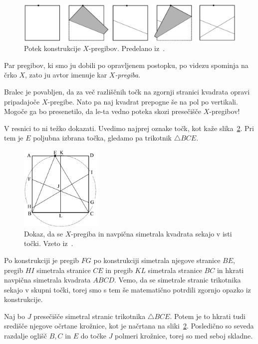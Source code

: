 \begin{figure}[h]
    \centering
    \includegraphics[width=\textwidth]{images/x-pregibi/konstrukcija.png}
    \caption[Konstrukcija $X$-pregibov]{Potek konstrukcije $X$-pregibov. Predelano iz~\cite[str.\ 34]{haga2008}.}
    \label{fig:x-pregib_konstr}
\end{figure}

Par pregibov, ki smo ju dobili po opravljenem postopku, po videzu spominja na črko $X$, zato ju avtor imenuje kar \emph{$X$-pregiba}.

Bralec je povabljen, da za več razliščnih točk na zgornji stranici kvadrata opravi pripadajoče $X$-pregibe. Nato pa naj kvadrat prepogne še na pol po vertikali. Mogoče ga bo presenetilo, da le-ta vedno poteka skozi presečišče $X$-pregibov!

V resnici to ni težko dokazati. Uvedimo najprej oznake točk, kot kaže slika~\ref{fig:x-pregib_dokaz}. Pri tem je $E$ poljubna izbrana točka, gledamo pa trikotnik $\triangle BCE$.
\begin{figure}[h]
    \centering
    \includegraphics[width=0.35\textwidth]{images/x-pregibi/dokaz_presecisca.png}
    \caption[Dokaz presečišča $X$-pregibov]{Dokaz, da se $X$-pregiba in navpična simetrala kvadrata sekajo v isti točki. Vzeto iz~\cite[str.\ 38]{haga2008}.}
    \label{fig:x-pregib_dokaz}
\end{figure}
Po konstrukciji je pregib $FG$ po konstrukciji simetrala njegove stranice $BE$, pregib $HI$ simetrala stranice $CE$ in pregib $KL$ simetrala stranice $BC$ in hkrati navpična simetrala kvadrata $ABCD$. Vemo, da se simetrale stranic trikotnika sekajo v skupni točki, torej smo s tem še matematično potrdili zgornjo opazko iz konstrukcije.

Naj bo $J$ presečišče simetral stranic trikotnika $\triangle BCE$. Potem je to hkrati tudi središče njegove očrtane krožnice, kot je načrtana na sliki~\ref{fig:x-pregib_dokaz}. Posledično so seveda razdalje oglišč $B, C$ in $E$ do točke $J$ polmeri krožnice, torej so med seboj skladne.

